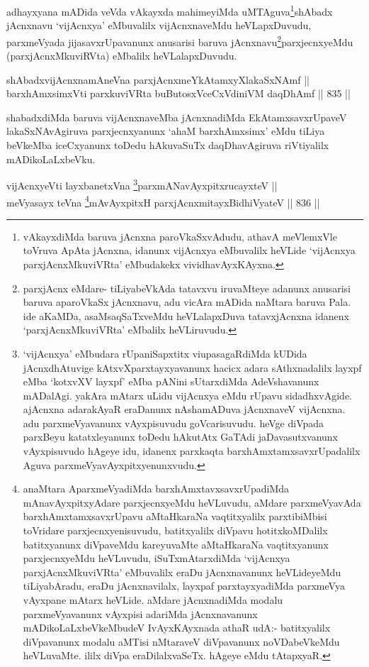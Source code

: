\begin{artha}
adhayxyana mADida veVda vAkayxda mahimeyiMda uMTAguva\footnote{vAkayxdiMda baruva jAcnxna paroVkaSxvAdudu, athavA meVlemxVle toVruva ApAta jAcnxna, idanunx vijAcnxya eMbuvalilx heVLide `vijAcnxya parxjAcnxMkuviVRta' eMbudakekx vividhavAyxKAyxna.}shAbadx jAcnxnavu `vijAcnxya' eMbuvalilx vijAcnxnaveMdu heVLapxDuvudu, parxmeVyada jijasavxrUpavanunx anusarisi baruva jAcnxnavu\footnote{parxjAcnx eMdare- tiLiyabeVkAda tatavxvu iruvaMteye adanunx anusarisi baruva aparoVkaSx jAcnxnavu, adu vicAra mADida naMtara baruva Pala. ide aKaMDa, asaMsaqSaTxveMdu heVLalapxDuva tatavxjAcnxna idanenx `parxjAcnxMkuviVRta' eMbalilx heVLiruvudu.}parxjecnxyeMdu (parxjAcnxMkuviRVta) eMbalilx heVLalapxDuvudu.
\end{artha}


\begin{shl}
shAbadxvijAcnxnamAneVna parxjAcnxmeYkAtamxyXlakaSxNAmf || \\
barxhAmxsimxVti parxkuviVRta buButosxVceCxVdiniVM daqDhAmf \hfill || 835 ||  
\end{shl}

\begin{artha}
shabadxdiMda baruva vijAcnxnaveMba jAcnxnadiMda EkAtamxsavxrUpaveV lakaSxNAvAgiruva parxjecnxyanunx `ahaM barxhAmxsimx' eMdu tiLiya beVkeMba iceCxyanunx toDedu hAkuvaSuTx daqDhavAgiruva riVtiyalilx mADikoLaLxbeVku.
\end{artha}



\begin{shl}
vijAcnxyeVti layxbanetxVna \footnote{`vijAcnxya' eMbudara rUpaniSapxtitx viupasagaRdiMda kUDida jAcnxdhAtuvige kAtxvXparxtayxyavanunx hacicx adara sAthxnadalilx layxpf eMba `kotxvXV layxpf' eMba pANini sUtarxdiMda AdeVshavanunx mADalAgi. yakAra mAtarx uLidu vijAcnxya eMdu rUpavu sidadhxvAgide. ajAcnxna adarakAyaR eraDanunx nAshamADuva jAcnxnaveV vijAcnxna. adu parxmeVyavanunx vAyxpisuvudu goVcarisuvudu. heVge diVpada parxBeyu katatxleyanunx toDedu hAkutAtx GaTAdi jaDavasutxvanunx vAyxpisuvudo hAgeye idu, idanenx parxkaqta barxhAmxtamxsavxrUpadalilx Aguva parxmeVyavAyxpitxyenunxvudu.}parxmANavAyxpitxrucayxteV ||  \\
meVyasayx teVna \footnote{anaMtara AparxmeVyadiMda barxhAmxtavxsavxrUpadiMda mAnavAyxpitxyAdare parxjecnxyeMdu heVLuvudu, aMdare parxmeVyavAda barxhAmxtamxsavxrUpavu aMtaHkaraNa vaqtitxyalilx parxtibiMbisi  toVridare parxjecnxyenisuvudu, batitxyalilx diVpavu hotitxkoMDalilx batitxyanunx diVpaveMdu kareyuvaMte aMtaHkaraNa vaqtitxyanunx parxjecnxyeMdu heVLuvudu, iSuTxmAtarxdiMda `vijAcnxya parxjAcnxMkuviVRta' eMbuvalilx eraDu jAcnxnavanunx heVLideyeMdu tiLiyabAradu, eraDu jAcnxnavilalx, layxpaf parxtayxyadiMda parxmeVya vAyxpane mAtarx heVLide. aMdare jAcnxnadiMda modalu parxmeVyavanunx vAyxpisi adariMda jAcnxnavanunx mADikoLaLxbeVkeMbudeV IvAyxKAyxnada athaR udA:- batitxyalilx diVpavanunx modalu aMTisi nMtaraveV diVpavanunx noVDabeVkeMdu heVLuvaMte. ililx diVpa eraDilalxvaSeTx. hAgeye eMdu tAtapxyaR.}mAvAyxpitxH parxjAcnxmitayxBidhiVyateV \hfill || 836 ||  
\end{shl}


